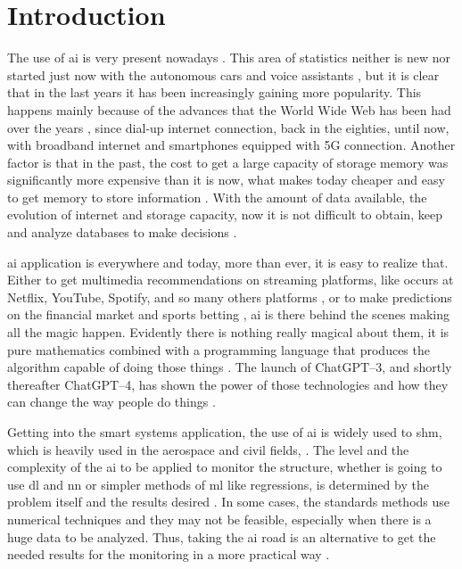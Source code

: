 \chapter{Introduction}

The use of \gls*{ai} is very present nowadays \citep{lee2020,poola2017,rabunal2006}. 
This area of statistics neither is new nor started just now with the autonomous cars and voice assistants \citep{muthukrishnan2020}, but it is clear that in the last years it has been increasingly gaining more popularity. 
This happens mainly because of the advances that the World Wide Web has been had over the years \citep{leiner2009,cohen-almagor2011}, since dial-up internet connection, back in the eighties, until now, with broadband internet and smartphones equipped with 5G connection. 
Another factor is that in the past, the cost to get a large capacity of storage memory was significantly more expensive than it is now, what makes today cheaper and easy to get memory to store information \citep{goda2012}. 
With the amount of data available, the evolution of  internet and storage capacity, now it is not difficult to obtain, keep and analyze databases to make decisions \citep{duan2019}.

\gls*{ai} application is everywhere and today, more than ever, it is easy to realize that. 
Either to get multimedia recommendations on streaming platforms, like occurs at Netflix, YouTube, Spotify, and so many others platforms \citep{chan-olmsted2019}, or to make predictions on the financial market and sports betting \citep{milana2021,kollar2021,hubacek2019}, \gls*{ai} is there behind the scenes making all the magic happen. 
Evidently there is nothing really magical about them, it is pure mathematics combined with a programming language that produces the algorithm capable of doing those things \citep{goodfellow2016,aurelien2022,raschka2015,raschka2022}.
The launch of ChatGPT--3, and shortly thereafter ChatGPT--4, has shown the power of those technologies and how they can change the way people do things \citep{biswas2023,biswas2023a, lund2023,baidoo-anu2023}.

Getting into the smart systems application, the use of \gls*{ai} is widely used to \gls*{shm}, which is heavily used in the aerospace and civil fields, \citep{azimi2020,ye2019}. 
The level and the complexity of the \gls*{ai} to be applied to monitor the structure, whether is going to use \gls*{dl} and \gls*{nn} or simpler methods of \gls*{ml} like regressions, is determined by the problem itself and the results desired \citep{farrar2012}. 
In some cases, the standards methods use numerical techniques and they may not be feasible, especially when there is a huge data to be analyzed. 
Thus, taking the \gls*{ai} road is an alternative to get the needed results for the monitoring in a more practical way \citep{smarsly2007,sun2020}. 

